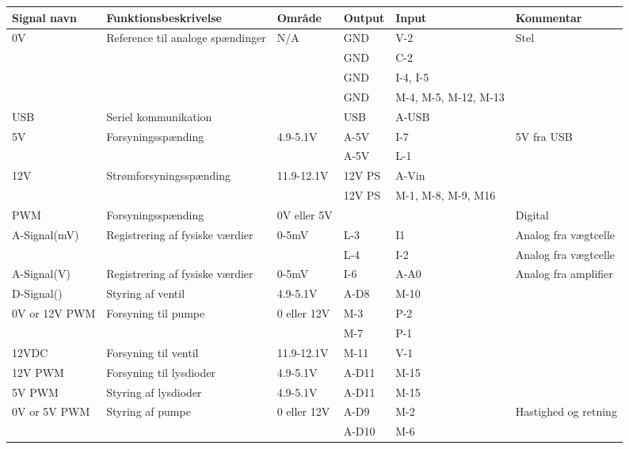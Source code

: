 \begin{center}
		\begin{longtable}{ | m{2cm} | m{5.5cm}| m{2cm}| m{1.250cm}| m{1.250cm}| m{2.5cm}| } 
			\hline
			\textbf{Signal navn} &\textbf{Funktionsbeskrivelse} &\textbf{Område} & \textbf{Output} & \textbf{Input} &\textbf{Kommentar}\\ 
			\hline
			\multirow{2}{*}{0V} &  \multirow{2}{*}{Reference til analoge  spændinger} & N/A & GND & V-2  & Stel \\ 
& & & GND & C-2 &   \\
& & & GND & I-4, I-5 &   \\
& & & GND & M-4, M-5, M-12, M-13 &   \\
			\hline	
			USB &  Seriel kommunikation & & USB & A-USB &  \\ 
			\hline	
			5V & \multirow{2}{*}{Forsyningsspænding} & 4.9-5.1V & A-5V & I-7 & 5V fra USB  \\ 
& & & A-5V & L-1 & \\
			\hline
			12V & \multirow{2}{*}{Strømforsyningsspænding} & 11.9-12.1V & 12V PS & A-Vin & \\
			& & & 12V PS & M-1, M-8, M-9, M16 &   \\ 
			\hline
			PWM & Forsyningsspænding & 0V eller 5V & &  & Digital \\ 
			\hline	
			A-Signal(mV) &\multirow{2}{*}{Registrering af fysiske værdier}  & 0-5mV & L-3 & I1 & Analog fra vægtcelle \\ 
			& & & L-4 & I-2 &  Analog fra vægtcelle \\
			\hline
			A-Signal(V) & Registrering af fysiske værdier & 0-5mV & I-6 & A-A0 & Analog fra amplifier\\ 
			\hline
			D-Signal() & Styring af ventil & 4.9-5.1V & A-D8 &M-10 & \\ 
			\hline
			0V or 12V PWM & \multirow{2}{*}{Forsyning til pumpe} & 0 eller 12V & M-3 & P-2 & \\
			& & & M-7 & P-1 & \\
			\hline	
			12VDC & Forsyning til ventil & 11.9-12.1V & M-11 & V-1 &  \\
			\hline
			12V PWM & Forsyning til lysdioder & 4.9-5.1V & A-D11 & M-15 &  \\
			\hline
			5V PWM & Styring af lysdioder & 4.9-5.1V & A-D11 & M-15 &  \\
			\hline
			0V or 5V PWM & \multirow{2}{*}{Styring af pumpe} & 0 eller 12V & A-D9 & M-2 & Hastighed og retning\\
			& & & A-D10 & M-6 & \\
			\hline
		\end{longtable}
	\end{center}


